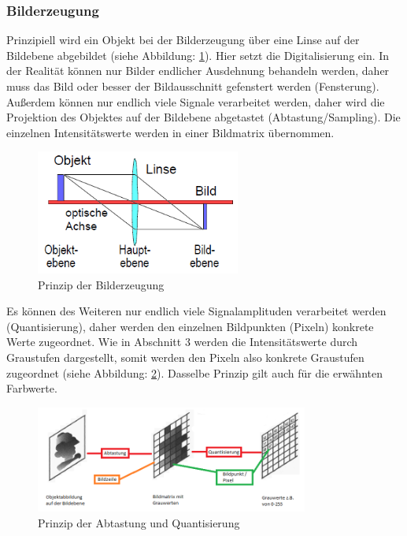 \subsubsection{Bilderzeugung}
Prinzipiell wird ein Objekt bei der Bilderzeugung über eine Linse auf der Bildebene abgebildet (siehe Abbildung: \ref{fig:bilderzeugung_steph}). Hier setzt die Digitalisierung ein. In der Realität können nur Bilder endlicher Ausdehnung behandeln werden, daher muss das Bild oder besser der Bildausschnitt gefenstert werden (Fensterung). Außerdem können nur endlich viele Signale verarbeitet werden, daher wird die Projektion des Objektes auf der Bildebene abgetastet (Abtastung/Sampling). Die einzelnen Intensitätswerte werden in einer Bildmatrix übernommen.

\begin{figure}
	\centering
		\includegraphics[width=0.6\textwidth]{img/prinzip_bilderzeugung.png}
	\caption[Prinzip der Bilderzeugung]{Prinzip der Bilderzeugung}
	\label{fig:bilderzeugung_steph}
\end{figure}

Es können des Weiteren nur endlich viele Signalamplituden verarbeitet werden (Quantisierung), daher werden den einzelnen Bildpunkten (Pixeln) konkrete Werte zugeordnet. Wie in Abschnitt 3 werden die Intensitätswerte durch Graustufen dargestellt, somit werden den Pixeln also konkrete Graustufen zugeordnet (siehe Abbildung: \ref{fig:abtastung_steph}). Dasselbe Prinzip gilt auch für die erwähnten Farbwerte.

\begin{figure}
	\centering
		\includegraphics[width=0.8\textwidth]{img/prinzip_abtastung.png}
	\caption[Prinzip der Abtastung und Quantisierung]{Prinzip der Abtastung und Quantisierung}
	\label{fig:abtastung_steph}
\end{figure}


